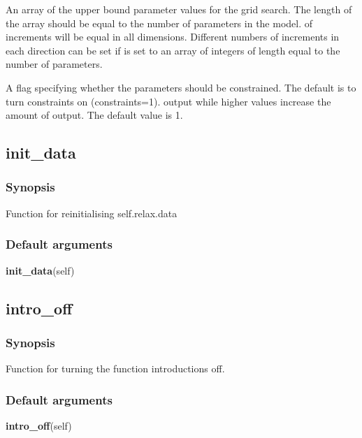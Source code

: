   An array of the upper bound parameter values for the grid search.  The length of the array should be equal to the number of parameters in the model.
of increments will be equal in all dimensions.  Different numbers of increments in each
direction can be set if 
 is set to an array of integers of length equal to the number
of parameters.

  A flag specifying whether the parameters should be constrained.  The default is to turn constraints on (constraints=1).
output while higher values increase the amount of output.  The default value is 1.


\newpage

\subsection{init\_data}


\subsubsection{Synopsis}

Function for reinitialising self.relax.data

\subsubsection{Default arguments}

\textsf{\textbf{init\_data}(self)}



\newpage

\subsection{intro\_off}


\subsubsection{Synopsis}

Function for turning the function introductions off.

\subsubsection{Default arguments}

\textsf{\textbf{intro\_off}(self)}



\newpage


